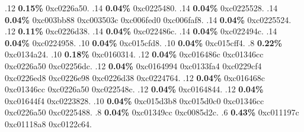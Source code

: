 \begin{profile}
{.12 \textbf{0.15\%} 0xc0226a50. 
.14 \textbf{0.04\%} 0xc0225480. 
.14 \textbf{0.04\%} 0xc0225528. 
.14 \textbf{0.04\%} 0xc003bb88\newline {} 0xc003503c\newline {} 0xc006fed0\newline {} 0xc006faf8. 
.14 \textbf{0.04\%} 0xc0225524. 
.12 \textbf{0.11\%} 0xc0226d38. 
.14 \textbf{0.04\%} 0xc022486c. 
.14 \textbf{0.04\%} 0xc022494c. 
.14 \textbf{0.04\%} 0xc0224958. 
.10 \textbf{0.04\%} 0xc015cfd8. 
.10 \textbf{0.04\%} 0xc015cff4. 
.8 \textbf{0.22\%} 0xc0134a24. 
.10 \textbf{0.18\%} 0xc0160314. 
.12 \textbf{0.04\%} 0xc016486c\newline {} 0xc01346cc\newline {} 0xc0226a50\newline {} 0xc02256dc. 
.12 \textbf{0.04\%} 0xc0164994\newline {} 0xc0133fa4\newline {} 0xc0229cf4\newline {} 0xc0226ed8\newline {} 0xc0226e98\newline {} 0xc0226d38\newline {} 0xc0224764. 
.12 \textbf{0.04\%} 0xc016468c\newline {} 0xc01346cc\newline {} 0xc0226a50\newline {} 0xc022548c. 
.12 \textbf{0.04\%} 0xc0164844. 
.12 \textbf{0.04\%} 0xc01644f4\newline {} 0xc0223828. 
.10 \textbf{0.04\%} 0xc015d3b8\newline {} 0xc015d0c0\newline {} 0xc01346cc\newline {} 0xc0226a50\newline {} 0xc0225488. 
.8 \textbf{0.04\%} 0xc01349cc\newline {} 0xc0085d2c. 
.6 \textbf{0.43\%} 0xc011197c\newline {} 0xc01118a8\newline {} 0xc0122c64. 
}
\end{profile}
